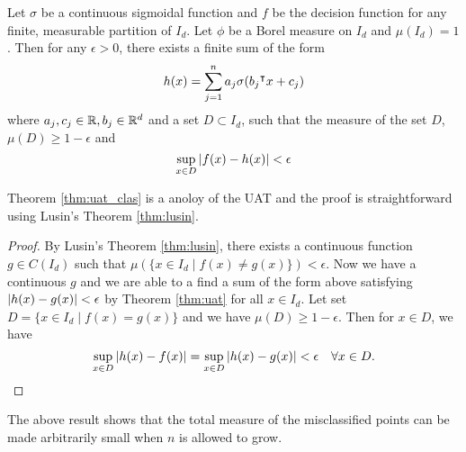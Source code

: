\begin{theorem}
    \label{thm:uat_clas}
    Let $\sigma$ be a continuous sigmoidal function and $f$ be the decision
    function for any finite, measurable partition of $I_d$. Let $\phi$ be a
    Borel measure on $I_d$ and $\mu(I_d) = 1$. Then for any $\epsilon>0$, there
    exists a finite sum of the form
    \begin{equation}
        h(x) = \sum_{j=1}^n a_j \sigma(b_j{}^{\intercal} x + c_j)
    \end{equation}
    where $a_j, c_j \in \mathbb{R}, b_j \in \mathbb{R}^d$ and a set $D\subset I_d$, such that
    the measure of the set $D$, $\mu(D) \geq 1 - \epsilon$ and
    \begin{equation}
        \sup_{x\in D}\left| f(x) - h(x) \right| < \epsilon
    \end{equation}
\end{theorem}

Theorem \ref{thm:uat_clas} is a anoloy of the UAT and the proof is
straightforward using Lusin's Theorem \eqref{thm:lusin}.

\begin{proof}
    By Lusin's Theorem \eqref{thm:lusin}, there exists a continuous function $g
    \in C(I_d)$ such that $\mu(\{x\in I_d \mid f(x) \not= g(x)\}) < \epsilon$.
    Now we have a continuous $g$ and we are able to a find a sum of the form
    above satisfying $\left| h(x) - g(x) \right| < \epsilon$ by Theorem \eqref{thm:uat}
    for all $x\in I_d$. Let set $D = \{x\in I_d \mid f(x) = g(x)\}$ and we have
    $\mu(D) \geq 1 - \epsilon$. Then for $x\in D$, we have
    \begin{equation}
        \sup_{x\in D}\left| h(x)-f(x) \right| = \sup_{x\in D}\left| h(x) - g(x) \right| < \epsilon 
        \quad \forall x\in D.
    \end{equation}
\end{proof}

The above result shows that the total measure of the misclassified points can be
made arbitrarily small when $n$ is allowed to grow.


